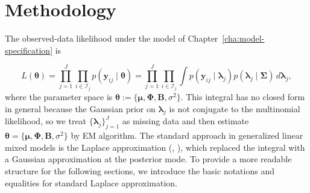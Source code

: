 \chapter{Methodology}
\label{cha:methodology}

The observed-data likelihood under the model of Chapter~\ref{cha:model-specification} is

\begin{equation}
    L(\bm{\theta})=\prod_{j=1}^{J}\prod_{i\in \mathcal{I}_{j}} p(\bm{y}_{ij}\mid \bm{\theta})=\prod_{j=1}^{J}\prod_{i\in \mathcal{I}_{j}} \int p(\bm{y}_{ij}\mid \bm{\lambda}_{j})p(\bm{\lambda}_{j}\mid \bm{\Sigma})\,d\bm{\lambda}_{j},
    \label{eq:log-lik-chap2}
\end{equation}
where the parameter space is $\bm{\theta}:=\{\bm{\mu}, \bm{\Phi}, \mathbf{B},\sigma^{2}\}$. This integral has no closed form in general because the Gaussian prior on $\bm{\lambda}_{j}$ is not conjugate to the multinomial likelihood, so we treat $\{\bm{\lambda}_{j}\}_{j=1}^{J}$ as missing data and then estimate $\bm{\theta}=\{\bm{\mu}, \bm{\Phi}, \mathbf{B},\sigma^{2}\}$ by EM algorithm. The standard approach in generalized linear mixed models is the Laplace approximation (\citep{Breslow1993}, \citep{Tierney1986}), which replaced the integral with a Gaussian approximation at the posterior mode. To provide a more readable structure for the following sections, we introduce the basic notations and equalities for standard Laplace approximation.


